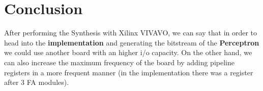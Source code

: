 \section{Conclusion}
After performing the Synthesis with Xilinx VIVAVO, we can say that in order to head into the \textbf{implementation} and generating the bitstream of the \textbf{Perceptron} we could use another board with an higher i/o capacity. On the other hand, we can also increase the maximum frequency of the board by adding pipeline registers in a more frequent manner (in the implementation there was a register after 3 FA modules). 